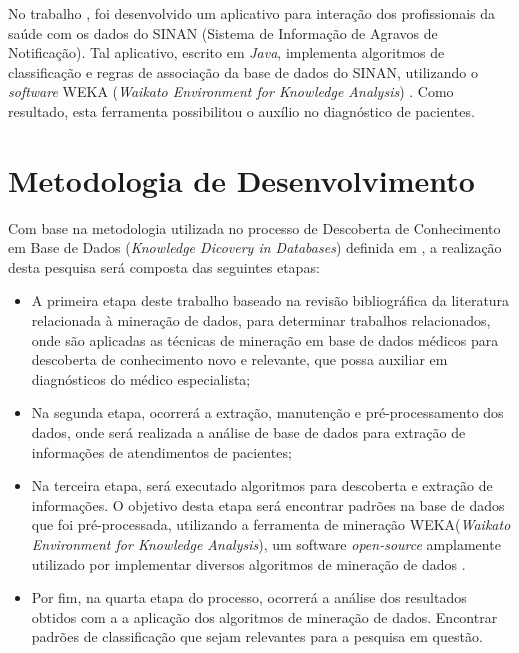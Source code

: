 \documentclass[
	12pt,				%
	openright,			%
	oneside,	
	a4paper,				%
	english,				%
	brazil				%
]{abntex2/abntex2} %
\begin{document}
	No trabalho \cite{santos:2011}, foi desenvolvido um aplicativo para interação dos profissionais da saúde com os dados do SINAN (Sistema de Informação de Agravos de Notificação). Tal aplicativo, escrito em  \textit{Java}\cite{oracle:2015}, implementa algoritmos de classificação e regras de associação da base de dados do SINAN, utilizando o \textit{software} WEKA (\textit{Waikato Environment for Knowledge Analysis}) \cite{weka:2015}. Como resultado, esta ferramenta possibilitou o auxílio no diagnóstico de pacientes.	

	\section{Metodologia de Desenvolvimento}
		
		Com base na metodologia utilizada no processo de Descoberta de Conhecimento em Base de Dados (\textit{Knowledge Dicovery in Databases}) definida em \cite{fayyad:1996}, a realização desta pesquisa será composta das seguintes etapas:
		
		\begin{itemize}
			
			\item A primeira etapa deste trabalho baseado na revisão bibliográfica da literatura relacionada à mineração de dados, para determinar trabalhos relacionados, onde são aplicadas as técnicas de mineração em base de dados médicos para descoberta de conhecimento novo e relevante, que possa auxiliar em diagnósticos do médico especialista;
			
			\item Na segunda etapa, ocorrerá a extração, manutenção e pré-processamento dos dados, onde será realizada a análise  de base de dados para extração de informações de atendimentos de pacientes;
			
			\item Na terceira etapa, será executado algoritmos para descoberta e extração de informações. O objetivo desta etapa será encontrar padrões na base de dados que foi pré-processada, utilizando a ferramenta de mineração WEKA(\textit{Waikato Environment for Knowledge Analysis}), um software \textit{open-source} \cite{opensource:2015} amplamente utilizado por implementar diversos algoritmos de mineração de dados \cite{hall:2009}.
			
			
			\item Por fim,  na quarta etapa do processo, ocorrerá a análise dos resultados obtidos com a a aplicação dos algoritmos de mineração de dados. Encontrar padrões de classificação que sejam relevantes para a pesquisa em questão.
			
		\end{itemize}
	
\end{document}
